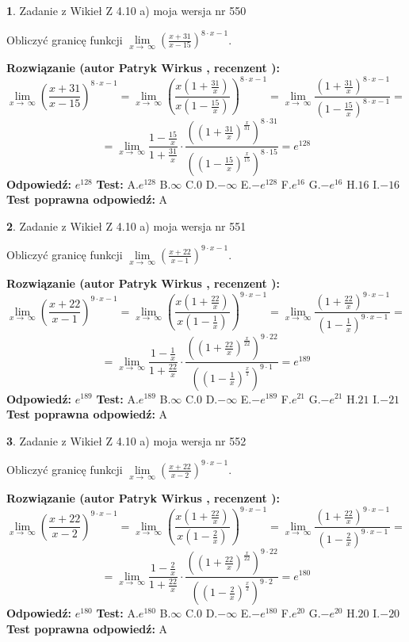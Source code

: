 \documentclass[12pt, a4paper]{article}
\theoremstyle{definition} %
\newtheorem{zad}{}
\newcommand{\zadStart}[1]{\begin{zad}#1\newline}
\newcommand{\zadStop}{\end{zad}}
\newcommand{\rozwStart}[2]{\noindent \textbf{Rozwiązanie (autor #1 , recenzent #2): }\newline}
\newcommand{\rozwStop}{\newline}
\newcommand{\odpStart}{\noindent \textbf{Odpowiedź:}\newline}
\newcommand{\odpStop}{\newline}
\newcommand{\testStart}{\noindent \textbf{Test:}\newline}
\newcommand{\testStop}{\newline}
\newcommand{\kluczStart}{\noindent \textbf{Test poprawna odpowiedź:}\newline}
\newcommand{\kluczStop}{\newline}
\begin{document}
\zadStart{Zadanie z Wikieł Z 4.10 a) moja wersja nr 550}

Obliczyć granicę funkcji  $\lim\limits_{x\to\ \infty}(\frac{x+31}{x-15})^{8\cdot x-1}$.
\zadStop
\rozwStart{Patryk Wirkus}{}
$$\lim\limits_{x\to\ \infty}(\frac{x+31}{x-15})^{8\cdot x-1} = \lim\limits_{x\to\ \infty}(\frac{x(1+\frac{31}{x})}{x(1-\frac{15}{x})})^{8\cdot x-1}=\lim\limits_{x\to\ \infty}\frac{(1+\frac{31}{x})^{8\cdot x-1}}{(1-\frac{15}{x})^{8\cdot x-1}}=$$
$$=\lim\limits_{x\to\ \infty}\frac{1-\frac{15}{x}}{1+\frac{31}{x}}\cdot\frac{((1+\frac{31}{x})^{\frac{x}{31}})^{8\cdot31}}{((1-\frac{15}{x})^{\frac{x}{15}})^{8\cdot15}}=e^{128}$$
\rozwStop
\odpStart
$e^{128}$
\odpStop
\testStart
A.$e^{128}$ B.$\infty$ C.$0$ D.$-\infty$ E.$-e^{128}$
F.$e^{16}$ G.$-e^{16}$
H.$16$
I.$-16$
\testStop
\kluczStart
A
\kluczStop



\zadStart{Zadanie z Wikieł Z 4.10 a) moja wersja nr 551}

Obliczyć granicę funkcji  $\lim\limits_{x\to\ \infty}(\frac{x+22}{x-1})^{9\cdot x-1}$.
\zadStop
\rozwStart{Patryk Wirkus}{}
$$\lim\limits_{x\to\ \infty}(\frac{x+22}{x-1})^{9\cdot x-1} = \lim\limits_{x\to\ \infty}(\frac{x(1+\frac{22}{x})}{x(1-\frac{1}{x})})^{9\cdot x-1}=\lim\limits_{x\to\ \infty}\frac{(1+\frac{22}{x})^{9\cdot x-1}}{(1-\frac{1}{x})^{9\cdot x-1}}=$$
$$=\lim\limits_{x\to\ \infty}\frac{1-\frac{1}{x}}{1+\frac{22}{x}}\cdot\frac{((1+\frac{22}{x})^{\frac{x}{22}})^{9\cdot22}}{((1-\frac{1}{x})^{\frac{x}{1}})^{9\cdot1}}=e^{189}$$
\rozwStop
\odpStart
$e^{189}$
\odpStop
\testStart
A.$e^{189}$ B.$\infty$ C.$0$ D.$-\infty$ E.$-e^{189}$
F.$e^{21}$ G.$-e^{21}$
H.$21$
I.$-21$
\testStop
\kluczStart
A
\kluczStop



\zadStart{Zadanie z Wikieł Z 4.10 a) moja wersja nr 552}

Obliczyć granicę funkcji  $\lim\limits_{x\to\ \infty}(\frac{x+22}{x-2})^{9\cdot x-1}$.
\zadStop
\rozwStart{Patryk Wirkus}{}
$$\lim\limits_{x\to\ \infty}(\frac{x+22}{x-2})^{9\cdot x-1} = \lim\limits_{x\to\ \infty}(\frac{x(1+\frac{22}{x})}{x(1-\frac{2}{x})})^{9\cdot x-1}=\lim\limits_{x\to\ \infty}\frac{(1+\frac{22}{x})^{9\cdot x-1}}{(1-\frac{2}{x})^{9\cdot x-1}}=$$
$$=\lim\limits_{x\to\ \infty}\frac{1-\frac{2}{x}}{1+\frac{22}{x}}\cdot\frac{((1+\frac{22}{x})^{\frac{x}{22}})^{9\cdot22}}{((1-\frac{2}{x})^{\frac{x}{2}})^{9\cdot2}}=e^{180}$$
\rozwStop
\odpStart
$e^{180}$
\odpStop
\testStart
A.$e^{180}$ B.$\infty$ C.$0$ D.$-\infty$ E.$-e^{180}$
F.$e^{20}$ G.$-e^{20}$
H.$20$
I.$-20$
\testStop
\kluczStart
A
\kluczStop
\end{document}

